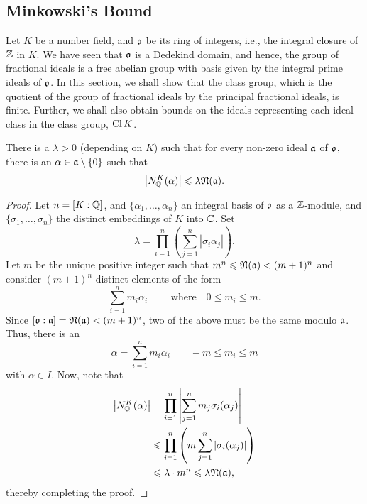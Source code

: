 \subsection{Minkowski's Bound}

Let $K$ be a number field, and $\mathfrak{o}$ be its ring of integers, i.e., the integral closure of $\mathbb{Z}$ in $K$. We have seen that $\mathfrak{o}$ is a Dedekind domain, and hence, the group of fractional ideals is a free abelian group with basis given by the integral prime ideals of $\mathfrak{o}$. In this section, we shall show that the class group, which is the quotient of the group of fractional ideals by the principal fractional ideals, is finite. Further, we shall also obtain bounds on the ideals representing each ideal class in the class group, $\operatorname{Cl} K$.

\begin{theorem}
    There is a $\lambda > 0$ (depending on $K$) such that for every non-zero ideal $\mathfrak{a}$ of $\mathfrak{o}$, there is an $\alpha\in\mathfrak{a}\setminus\{0\}$ such that 
    \begin{equation*}
        \left|N^K_{\mathbb{Q}}(\alpha)\right|\leqslant\lambda\mathfrak{N}(\mathfrak{a}).
    \end{equation*}
\end{theorem}
\begin{proof}
    Let $n = [K : \mathbb{Q}]$, and $\{\alpha_1,\dots,\alpha_n\}$ an integral basis of $\mathfrak{o}$ as a $\mathbb{Z}$-module, and $\{\sigma_1,\dots,\sigma_n\}$ the distinct embeddings of $K$ into $\mathbb{C}$. Set 
    \begin{equation*}
        \lambda = \prod_{i = 1}^{n}\left(\sum_{j = 1}^n |\sigma_i\alpha_j|\right).
    \end{equation*}
    Let $m$ be the unique positive integer such that $m^n\leqslant\mathfrak{N}(\mathfrak{a}) < (m + 1)^n$ and consider $(m + 1)^n$ distinct elements of the form 
    \begin{equation*}
        \sum_{i = 1}^n m_i\alpha_i\qquad\text{ where}\quad 0\le m_i\le m.
    \end{equation*}
    Since $[\mathfrak{o} : \mathfrak{a}] = \mathfrak{N}(\mathfrak{a}) < (m + 1)^n$, two of the above must be the same modulo $\mathfrak{a}$. Thus, there is an 
    \begin{equation*}
        \alpha = \sum_{i = 1}^n m_i\alpha_i\qquad -m\le m_i\le m
    \end{equation*}
    with $\alpha\in I$. Now, note that 
    \begin{align*}
        \left|N^K_{\mathbb{Q}}(\alpha)\right| &= \prod_{i = 1}^n\left|\sum_{j = 1}^n m_j\sigma_i(\alpha_j)\right|\\
        &\leqslant\prod_{i = 1}^n \left(m\sum_{j = 1}^n |\sigma_i(\alpha_j)|\right)\\
        &\leqslant \lambda\cdot m^n\leqslant \lambda\mathfrak{N}(\mathfrak{a}),
    \end{align*}
    thereby completing the proof.
\end{proof}

